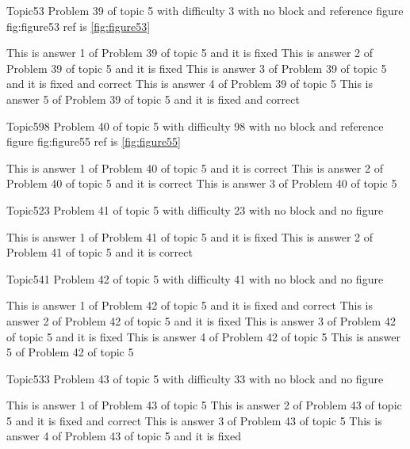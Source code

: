 \documentclass[master]{exam}
\begin{document}
\begin{problem}{Topic5}{3}
	Problem 39 of topic 5 with difficulty 3 with no block and reference figure fig:figure53 ref is \ref{fig:figure53}
	\begin{answers}
		\answer[fixed] This is answer 1 of Problem 39 of topic 5 and it is fixed
		\answer[fixed] This is answer 2 of Problem 39 of topic 5 and it is fixed
		 This is answer 3 of Problem 39 of topic 5 and it is fixed and correct
		\answer This is answer 4 of Problem 39 of topic 5 
		 This is answer 5 of Problem 39 of topic 5 and it is fixed and correct
	\end{answers}
\end{problem}

\begin{problem}{Topic5}{98}
	Problem 40 of topic 5 with difficulty 98 with no block and reference figure fig:figure55 ref is \ref{fig:figure55}
	\begin{answers}
		\answer[correct] This is answer 1 of Problem 40 of topic 5 and it is correct
		\answer[correct] This is answer 2 of Problem 40 of topic 5 and it is correct
		\answer This is answer 3 of Problem 40 of topic 5 
	\end{answers}
\end{problem}

\begin{problem}{Topic5}{23}
	Problem 41 of topic 5 with difficulty 23 with no block and no figure
	\begin{answers}
		\answer[fixed] This is answer 1 of Problem 41 of topic 5 and it is fixed
		\answer[correct] This is answer 2 of Problem 41 of topic 5 and it is correct
	\end{answers}
\end{problem}

\begin{problem}{Topic5}{41}
	Problem 42 of topic 5 with difficulty 41 with no block and no figure
	\begin{answers}
		 This is answer 1 of Problem 42 of topic 5 and it is fixed and correct
		\answer[fixed] This is answer 2 of Problem 42 of topic 5 and it is fixed
		\answer[fixed] This is answer 3 of Problem 42 of topic 5 and it is fixed
		\answer This is answer 4 of Problem 42 of topic 5 
		\answer This is answer 5 of Problem 42 of topic 5 
	\end{answers}
\end{problem}

\begin{problem}{Topic5}{33}
	Problem 43 of topic 5 with difficulty 33 with no block and no figure
	\begin{answers}
		\answer This is answer 1 of Problem 43 of topic 5 
		 This is answer 2 of Problem 43 of topic 5 and it is fixed and correct
		\answer This is answer 3 of Problem 43 of topic 5 
		\answer[fixed] This is answer 4 of Problem 43 of topic 5 and it is fixed
	\end{answers}
\end{problem}
\end{document}
